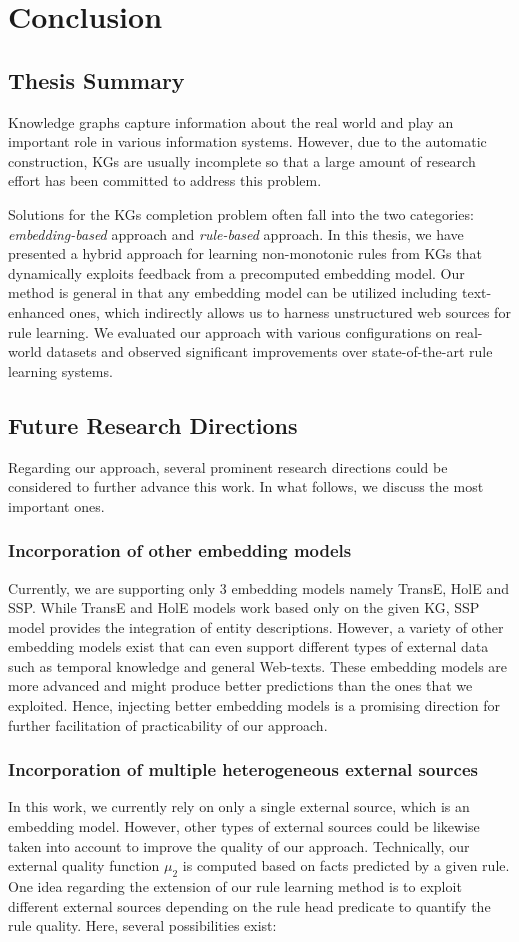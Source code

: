 \chapter{Conclusion}
\label{chap:conclusion}
\section{Thesis Summary}
Knowledge graphs capture information about the real world and play an important role in various information systems. However, due to the automatic construction, KGs are usually incomplete so that a large amount of research effort has been committed to address this problem.

Solutions for the KGs completion problem often fall into the two categories: \textit{embedding-based} approach and \textit{rule-based} approach. In this thesis, we have presented a hybrid approach for learning non-monotonic rules from KGs that dynamically exploits feedback from a precomputed embedding model. Our method is general in that any embedding model can be utilized including text-enhanced ones, which indirectly allows us to harness unstructured web sources for rule learning. We evaluated our approach with various configurations on real-world datasets and observed significant improvements over state-of-the-art rule learning systems.
\section{Future Research Directions}
Regarding our approach, several prominent research directions could be considered to further advance this work. In what follows, we discuss the most important ones.
\subsection{Incorporation of other embedding models}
Currently, we are supporting only 3 embedding models namely TransE, HolE and SSP. While TransE and HolE models work based only on the given KG, SSP model provides the integration of entity descriptions. However, a variety of other embedding models exist that can even support different types of external data such as temporal knowledge and general Web-texts. These embedding models are more advanced and might produce better predictions than the ones that we exploited. Hence, injecting better embedding models is a promising direction for further facilitation of practicability of our approach.

\subsection{Incorporation of multiple heterogeneous external sources}
In this work, we currently rely on only a single external source, which is an embedding model. However, other types of external sources could be likewise taken into account to improve the quality of our approach. Technically, our external quality function $\mu_2$ is computed based on facts predicted by a given rule. One idea regarding the extension of our rule learning method is to exploit different external sources depending on the rule head predicate to quantify the rule quality.
Here, several possibilities exist:

